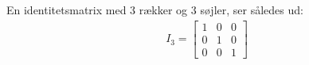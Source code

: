 En identitetsmatrix med $3$ rækker og $3$ søjler, ser således ud:
\begin{align*}
I_3 = \begin{bmatrix}
	1 & 0 & 0 \\
	0 & 1 & 0 \\
	0 & 0 & 1 
\end{bmatrix}
\end{align*}

%
%
%
